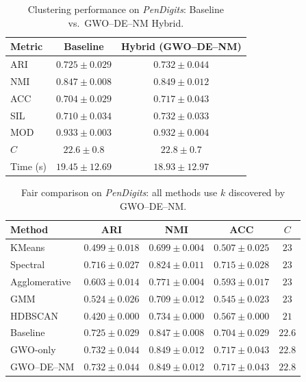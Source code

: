 \begin{table}[htbp]
\centering
\caption{Clustering performance on \textit{PenDigits}: Baseline vs.\ GWO--DE--NM Hybrid.}
\label{tab:pendigits}
\begin{tabular}{lcc}
\toprule
Metric & Baseline & Hybrid (GWO--DE--NM) \\
\midrule
ARI & $0.725 \pm 0.029$ & $\mathbf{0.732 \pm 0.044}$ \\
NMI & $0.847 \pm 0.008$ & $\mathbf{0.849 \pm 0.012}$ \\
ACC & $0.704 \pm 0.029$ & $\mathbf{0.717 \pm 0.043}$ \\
SIL & $0.710 \pm 0.034$ & $\mathbf{0.732 \pm 0.033}$ \\
MOD & $\mathbf{0.933 \pm 0.003}$ & $0.932 \pm 0.004$ \\
\midrule
$C$ & $22.6 \pm 0.8$ & $22.8 \pm 0.7$ \\
Time (s) & $19.45 \pm 12.69$ & $18.93 \pm 12.97$ \\
\bottomrule
\end{tabular}
\end{table}

\begin{table}[htbp]
\centering\small
\caption{Fair comparison on \textit{PenDigits}: all methods use $k$ discovered by GWO--DE--NM.}
\label{tab:fair_pendigits}
\begin{tabular}{lcccc}
\toprule
Method & ARI & NMI & ACC & $C$ \\
\midrule
KMeans & $0.499 \pm 0.018$ & $0.699 \pm 0.004$ & $0.507 \pm 0.025$ & $23$ \\
Spectral & $0.716 \pm 0.027$ & $0.824 \pm 0.011$ & $0.715 \pm 0.028$ & $23$ \\
Agglomerative & $0.603 \pm 0.014$ & $0.771 \pm 0.004$ & $0.593 \pm 0.017$ & $23$ \\
GMM & $0.524 \pm 0.026$ & $0.709 \pm 0.012$ & $0.545 \pm 0.023$ & $23$ \\
HDBSCAN & $0.420 \pm 0.000$ & $0.734 \pm 0.000$ & $0.567 \pm 0.000$ & $21$ \\
\midrule
Baseline & $0.725 \pm 0.029$ & $0.847 \pm 0.008$ & $0.704 \pm 0.029$ & $22.6$ \\
GWO-only & $\mathbf{0.732 \pm 0.044}$ & $0.849 \pm 0.012$ & $0.717 \pm 0.043$ & $22.8$ \\
GWO--DE--NM & $0.732 \pm 0.044$ & $0.849 \pm 0.012$ & $0.717 \pm 0.043$ & $22.8$ \\
\bottomrule
\end{tabular}
\end{table}

